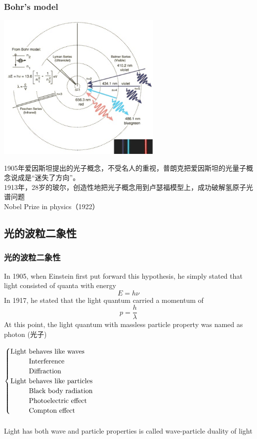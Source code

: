 \begin{frame}   
    \frametitle{Bohr's model}  
    \begin{center}
        \includegraphics[width=0.6\textwidth]{figs/bohrmodel.png}
    \end{center}  
    {\Bullet} 1905年爱因斯坦提出的光子概念，不受名人的重视，普朗克把爱因斯坦的光量子概念说成是“迷失了方向”。\\
    {\Bullet} 1913年，28岁的玻尔，创造性地把光子概念用到卢瑟福模型上，成功破解氢原子光谱问题 \\
    {\color{deepred} {\Bullet} Nobel Prize in physics（1922）}\\ 
\end{frame}

\subsection{光的波粒二象性} 

\begin{frame} 
  \frametitle{光的波粒二象性}  
  {\Bullet} In 1905, when Einstein first put forward this hypothesis, 
  he simply stated that light consisted of quanta with energy \[ E = h\nu \] 
  {\Bullet} In 1917, he stated that the light quantum carried a momentum of  \[ p=\frac{h}{\lambda}\]
  At this point, the light quantum with massless particle property was named as photon (光子)
\end{frame}

\begin{frame}  
  $\begin{cases}
    \text{Light behaves like waves }\\
    \text{~~\qquad Interference} \\
    \text{~~\qquad Diffraction} \\
    \text{Light behaves like particles}\\
    \text{~~\qquad Black body radiation} \\
    \text{~~\qquad Photoelectric effect} \\
    \text{~~\qquad Compton effect} \\
   \end{cases}$\\
   ~~\\
   Light has both wave and particle properties is called \alert{wave-particle duality} of light
\end{frame}


